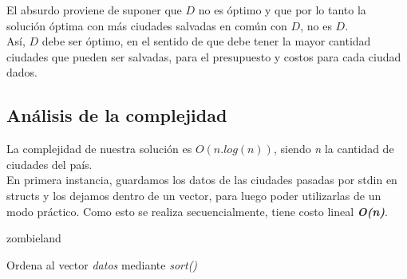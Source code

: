 El absurdo proviene de suponer que $D$ no es óptimo y que por lo tanto la solución óptima con más ciudades salvadas en común con $D$, no es $D$.\\

Así, $D$ debe ser óptimo, en el sentido de que debe tener la mayor cantidad ciudades que pueden ser salvadas, para el presupuesto y costos para cada ciudad dados.

\newpage
\subsection{An\'alisis de la complejidad}
La complejidad de nuestra soluci\'on es $O(n.log(n))$, siendo \emph{n} la cantidad de ciudades del pa\'is.\\

En primera instancia, guardamos los datos de las ciudades pasadas por stdin en structs y los dejamos dentro de un vector, para luego poder utilizarlas de un modo pr\'actico. Como esto se realiza secuencialmente, tiene costo lineal \textbf{\textit{O(n)}}.

\begin{algorithm}[h!]
\caption{zombieland}
Ordena al vector \emph{datos} mediante \textit{sort()}\\
\end{algorithm}

